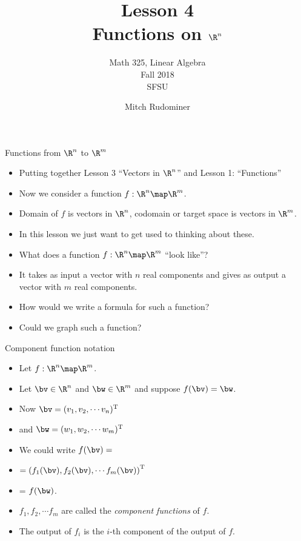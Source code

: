 \documentclass{beamer}
\title{Lesson 4 \\ Functions on $\R^n$}
\subtitle{Math 325, Linear Algebra \\ Fall 2018 \\ SFSU}
\author{Mitch Rudominer}
\date{}
\begin{document}
\begin{frame}
  \titlepage
\end{frame}


\beamerdefaultoverlayspecification{<+->}

\begin{frame}{Functions from $\R^n$ to $\R^m$}

\begin{itemize}
\item Putting together Lesson 3 ``Vectors in $\R^n$'' and Lesson 1: ``Functions''
\item Now we consider a function $f:\R^n \map \R^m$.
\item Domain of $f$ is vectors in $\R^n$, codomain or target space is vectors
in $\R^m$.
\item In this lesson we just want to get used to thinking about these.
\item What does a function $f:\R^n \map \R^m$ ``look like''?
\item It takes as input a vector with $n$ real components and gives as output
a vector with $m$ real components.
\item How would we write a formula for such a function?
\item Could we graph such a function?
\end{itemize}

\end{frame}

\begin{frame}{Component function notation}

\begin{itemize}
\item Let $f:\R^n \map \R^m$.
\item Let $\bv \in \R^n$ and $\bw \in \R^m$ and suppose $f(\bv) = \bw$.
\item Now $\bv = (v_1, v_2, \cdots v_n)^{\text{T}}$
\item and $\bw = (w_1, w_2, \cdots w_m)^{\text{T}}$
\item We could write $f(\bv) =$
\item $ = \left(f_1(\bv), f_2(\bv), \cdots f_m(\bv)\right)^{\text{T}}$
\item = $f(\bw)$.
\item $f_1,f_2,\cdots f_m$ are called the \emph{component functions} of $f$.
\item The output of $f_i$ is the $i$-th component of the output of $f$.
\end{itemize}

\end{frame}
\end{document}
